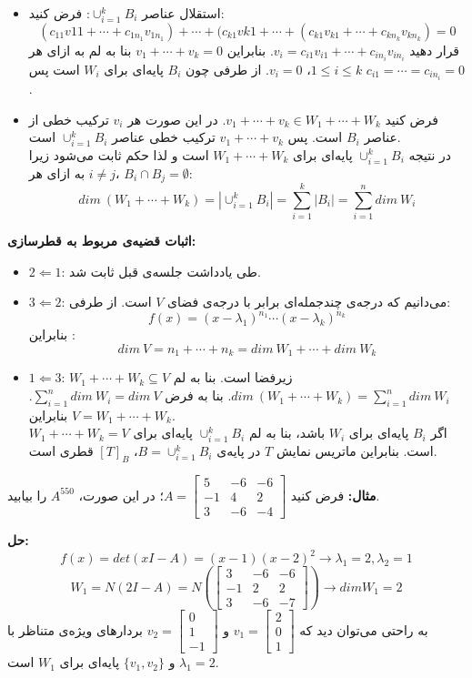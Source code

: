 \begin{itemize}
	\item استقلال عناصر $\cup_{i=1}^k B_i$: فرض کنید:
	$$(c_{11}v{11}+\cdots + c_{1n_1}v_{1n_1}) + \cdots + (c_{k1}v{k1} + \cdots + (c_{k1}v_{k1} + \cdots+ c_{kn_k}v_{kn_k}) = 0$$
	قرار دهید $v_i = c_{i1}v_{i1} + \cdots + c_{in_i}v_{in_i}$. بنابراین $v_1+\cdots+v_k = 0$ بنا به لم به ازای هر $1\leq i \leq k$، $v_i =0$. از طرفی چون $B_i$ پایه‌ای برای $W_i$ است پس $c_{i1} = \cdots = c_{in_i} = 0$.
	\item فرض کنید $v_1+ \cdots +v_k \in W_1+\cdots+W_k$. در این صورت هر $v_i$ ترکیب خطی از عناصر $B_i$ است. پس $v_1+\cdots+v_k$ ترکیب خطی عناصر $\cup_{i=1}^k B_i$ است.\\
	در نتیجه $\cup_{i=1}^k B_i$ پایه‌ای برای $W_1+\cdots+W_k$ است و لذا حکم ثابت می‌شود زیرا به ازای هر $i\neq j$، $B_i\cap B_j = \emptyset $:
	$$dim\: (W_1+\cdots + W_k) = |\cup_{i=1}^k B_i| = \sum_{i=1}^k|B_i| = \sum_{i=1}^n dim\: W_i$$
\end{itemize}
\textbf{اثبات قضیه‌ی مربوط به قطر‌سازی:}\\
\begin{itemize}
	\item $2 \Leftarrow 1$: طی یادداشت جلسه‌ی قبل ثابت شد.
	\item $3 \Leftarrow 2$: می‌دانیم که درجه‌ی چند‌جمله‌ای برابر با درجه‌ی فضا‌ی $V$ است. از طرفی:
	$$f(x) = (x-\lambda_1)^{n_1} \cdots (x-\lambda_k)^{n_k}$$
	بنابراین :
	$$dim\: V = n_1+\cdots+ n_k = dim\: W_1+ \cdots + dim\: W_k$$
	\item $1 \Leftarrow 3$: $W_1+ \cdots+ W_k \subseteq V$ زیرفضا است. بنا به لم $dim\: (W_1+ \cdots+ W_k) = \sum_{i=1}^n dim\: W_i$. بنا به فرض $\sum_{i=1}^n dim \:W_i = dim\: V$. بنابراین $V = W_1+\cdots+ W_k$. \\
	اگر $B_i$ پایه‌ای برای $W_i$ باشد، بنا به لم $\cup_{i=1}^k B_i$ پایه‌ای برای $W_1+\cdots+W_k = V$ است. بنابراین ماتریس نمایش $T$ در پایه‌ی $B = \cup_{i=1}^k B_i$، $[T]_B$ قطری است.
\end{itemize}


\textbf{مثال:}
فرض کنید
$A=\begin{bmatrix}
5 & -6 & -6 \\
-1 & 4 & 2 \\
3 & -6 & -4
\end{bmatrix}$؛
در این صورت، $A^{550}$ را بیابید.

\textbf{حل:}
$$f(x)=det(xI-A)=(x-1)(x-2)^2 \to \lambda_1=2, \lambda_2=1 $$
$$ W_1 = N(2I-A)=N(\begin{bmatrix}
3 & -6 & -6 \\
-1 & 2 & 2 \\
3 & -6 & -7
\end{bmatrix}) \to dimW_1 = 2$$
به راحتی می‌توان دید که
$v_1 = \begin{bmatrix}
2 \\
0 \\
1
\end{bmatrix} $
و
$v_2 = \begin{bmatrix}
0 \\
1 \\
-1
\end{bmatrix} $
بردارهای ویژه‌ی متناظر با
$\lambda_1=2$
و
$\{v_1,v_2\}$
پایه‌ای برای $W_1$ است.


